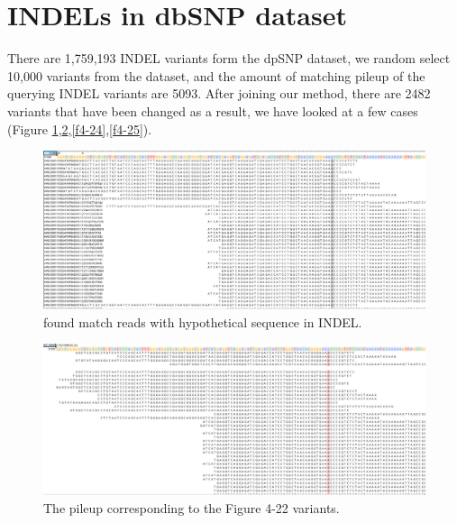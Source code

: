 \section{INDELs in dbSNP dataset}

There are 1,759,193 INDEL variants form the dpSNP dataset, we random select 10,000 variants from the dataset, and the amount of matching pileup of the querying INDEL variants are 5093. After joining our method, there are 2482 variants that have been changed as a result, we have looked at a few cases  (Figure \ref{f4-22},\ref{f4-23},\ref{f4-24},\ref{f4-25}).

\vspace{1cm}
\begin{figure}[H]
    \centering
    \includegraphics[width=1\columnwidth]{body/image/4-22.png}
    \captionsetup{labelfont=bf}
    \renewcommand{\baselinestretch}{1.0}
    \vspace{-1cm}
    \caption[INDEL match reads]{ found match reads with hypothetical sequence in INDEL.}
    \label{f4-22}
\end{figure}

\vspace{0.5cm}
\begin{figure}[H]
    \centering
    \includegraphics[width=1\columnwidth]{body/image/4-23.png}
    \captionsetup{labelfont=bf}
    \renewcommand{\baselinestretch}{1.0}
    \vspace{-1cm}
    \caption[Figure 4.22 pileup]{ The pileup corresponding to the Figure 4-22 variants.}
    \label{f4-23}
\end{figure}

